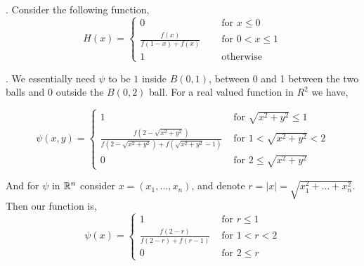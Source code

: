 \documentclass[a4paper]{article}
\begin{document}
\vspace{1em}

. Consider the following function, 
\[
    H(x)= \begin{cases}
        0 \quad &\text{ for } x \le 0\\
        \frac{f\left(x\right)}{f\left(1-x\right)+f\left(x\right)} \quad &\text{ for } 0 < x \le 1\\
        1 \quad &\text{ otherwise }
    \end{cases}
\]


. We essentially need $\psi$ to be $1$ inside $B(0, 1)$, between 0 and 1 between the two balls and $0$ outside the $B(0, 2)$ ball. For a real valued function in $R^2$ we have, 

\[
    \psi(x, y) = \begin{cases}
        1 \quad &\text{ for } \sqrt{x^2 + y^2} \le 1\\
        \frac{f\left(2-\sqrt{x^{2}+y^{2}}\right)}{f\left(2-\sqrt{x^{2}+y^{2}}\right)+f\left(\sqrt{x^{2}+y^{2}}-1\right)} &\text{ for }1 < \sqrt{x^{2}+y^{2}} < 2\\
        0 \quad &\text{ for } 2 \le \sqrt{x^2 + y^2} 
    \end{cases}
\]

And for $\psi$ in $\mathbb{R}^{n}$ consider $x = (x_{1}, \dots, x_n)$, and denote $r = |x| = \sqrt{x_{1}^2 + \dots + x_n^2}$. Then our function is, 
\[
    \psi(x) = \begin{cases}
        1 \quad &\text{ for } r \le 1\\
        \frac{f\left(2-r\right)}{f\left(2-r\right)+f\left(r-1\right)} &\text{ for }1 < r < 2\\
        0 \quad &\text{ for } 2 \le r 
    \end{cases}
\]

\vspace{1em}

\end{document}
